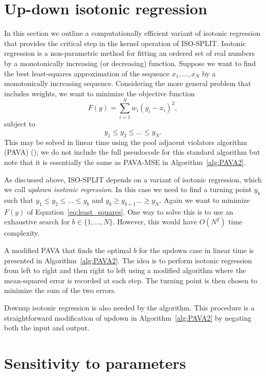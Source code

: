\documentclass[10pt]{article}
\begin{document}
\section {Up-down isotonic regression}
\label{appendixUpdown}

In this section we outline a computationally efficient variant of isotonic regression that provides the critical step in the kernel operation of ISO-SPLIT. Isotonic regression is a non-parametric method for fitting an ordered set of real numbers by a monotonically increasing (or decreasing) function. Suppose we want to find the best least-squares approximation of the sequence $x_1,\dots,x_N$ by a monotonically increasing sequence. Considering the more general problem that includes weights, we want to minimize the objective function
\begin{equation}
F(y)=\sum_{i=1}^N w_i(y_i-x_i)^2,
\label{eq:least_squares}
\end{equation}
subject to
$$y_1\leq y_2\leq\dots\leq y_N.$$
This may be solved in linear time using the pool adjacent violators algorithm (PAVA) (\cite{pava}); we do not include the full pseudocode for this standard algorithm but note that it is essentially the same as PAVA-MSE in Algorithm~\ref{alg:PAVA2}.

As discussed above, ISO-SPLIT depends on a variant of isotonic regression, which we call \emph{updown isotonic regression}. In this case we need to find a turning point $y_b$ such that $y_1\leq y_2\leq\dots\leq y_b$ and $y_b\geq y_{b+1}\dots\geq y_N$. Again we want to minimize $F(y)$ of Equation~\eqref{eq:least_squares}. One way to solve this is to use an exhaustive search for $b\in\{1,\dots,N\}$. However, this would have $O(N^2)$ time complexity.

A modified PAVA that finds the optimal $b$ for the updown case in linear time is presented in Algorithm~\ref{alg:PAVA2}. The idea is to perform isotonic regression from left to right and then right to left using a modified algorithm where the mean-squared error is recorded at each step. The turning point is then chosen to minimize the sum of the two errors.

Downup isotonic regression is also needed by the algorithm. This procedure is a straightforward modification of updown in Algorithm~\ref{alg:PAVA2} by negating both the input and output.

\section {Sensitivity to parameters}
\label{appendixSensitivity}
\end{document}
